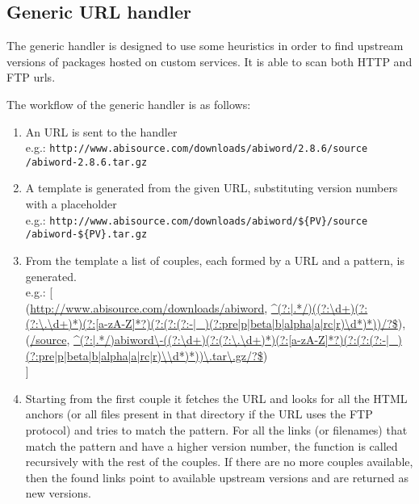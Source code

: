 \subsection{Generic URL handler}
The generic handler is designed to use some heuristics in order to find upstream versions of packages hosted on custom services. It is able to scan both HTTP and FTP urls.

The workflow of the generic handler is as follows:

\begin{enumerate}
\item An URL is sent to the handler \\ 
e.g.: \texttt{http://www.abisource.com/downloads/abiword/2.8.6/source} \\
\texttt{/abiword-2.8.6.tar.gz}

\item A template is generated from the given URL, substituting version numbers with a placeholder \\
e.g.: \texttt{http://www.abisource.com/downloads/abiword/\$\{PV\}/source} \\
\texttt{/abiword-\$\{PV\}.tar.gz}


\item From the template a list of couples, each formed by a URL and a pattern, is generated. \\
e.g.: [\\
    (\url{http://www.abisource.com/downloads/abiword}, \url{^(?:|.*/)((?:\d+)(?:(?:\.\d+)*)(?:[a-zA-Z]*?)(?:(?:(?:-|_)(?:pre|p|beta|b|alpha|a|rc|r)\d*)*))/?\$}), \\

    (\url{/source}, \url{^(?:|.*/)abiword\-((?:\d+)(?:(?:\.\d+)*)(?:[a-zA-Z]*?)(?:(?:(?:-|_)(?:pre|p|beta|b|alpha|a|rc|r)\\d*)*))\.tar\.gz/?\$}) \\
]
 
\item Starting from the first couple it fetches the URL and looks for all the HTML anchors (or all files present in that directory if the URL uses the FTP protocol) and tries to match the pattern. For all the links (or filenames) that match the pattern and have a higher version number, the function is called recursively with the rest of the couples. If there are no more couples available, then the found links point to available upstream versions and are returned as new versions.
\end{enumerate}

